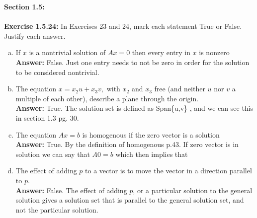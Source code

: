 \documentclass{amsart}
\begin{document}
{\huge\textbf{Section 1.5:}}\\\\
\noindent\textbf{Exercise 1.5.24: }In Exercises 23 and 24, mark each statement True or False. Justify each answer.

\begin{enumerate}[(a)]
\item If $x$ is a nontrivial solution of $Ax=0$ then every entry in $x$ is nonzero \\
\noindent \textbf{Answer: }False. Just one entry needs to not be zero in order for the solution to be considered nontrivial.
\vspace{1in}

\item The equation $x= x_2u+x_3v,$ with $x_2$ and $x_3$ free (and neither $u$ nor $v$ a multiple of each other), describe a plane through the origin. \\
\noindent \textbf{Answer: }True. The solution set is defined as Span\{u,v\} , and we can see this in section 1.3 pg. 30.
\vspace{1in}

\item The equation $Ax=b$ is homogenous if the zero vector is a solution\\
\noindent \textbf{Answer: }True. By the definition of homogenous p.43. If zero vector is in solution we can say that $A0=b$ which then implies that 
\vspace{1in}

\item The effect of adding $p$ to a vector is to move the vector in a direction parallel to $p$.\\
\noindent \textbf{Answer: }False. The effect of adding $p$, or a particular solution to the general solution gives a solution set that is parallel to the general solution set, and not the particular solution.

\vspace{1in}


\end{enumerate}
\vspace{1in}
\end{document}

